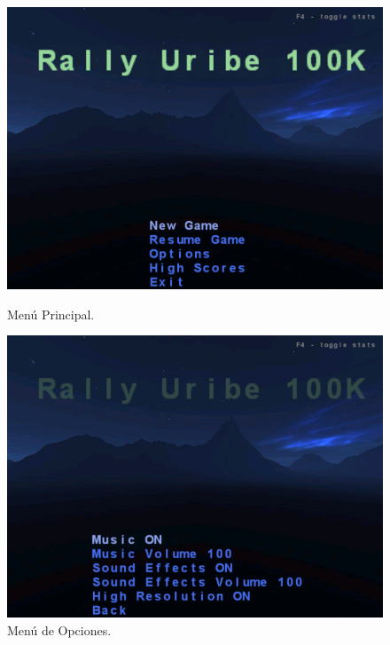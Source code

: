 \documentclass[a4paper,11pt]{article}
\begin{document}
\begin{figure}
\begin{minipage}[b]{0.5\linewidth}
\centering
 \includegraphics[scale=0.250]{./main_menu.png}
 \caption{Menú Principal.}
\label{fig:figure0}
\end{minipage}
\hspace{0.5cm}
\begin{minipage}[b]{0.5\linewidth}
\centering
 \includegraphics[scale=0.250]{./options_menu.png}
 \caption{Menú de Opciones.}
\label{fig:figure00}
\end{minipage}
\end{figure}
\end{document}

